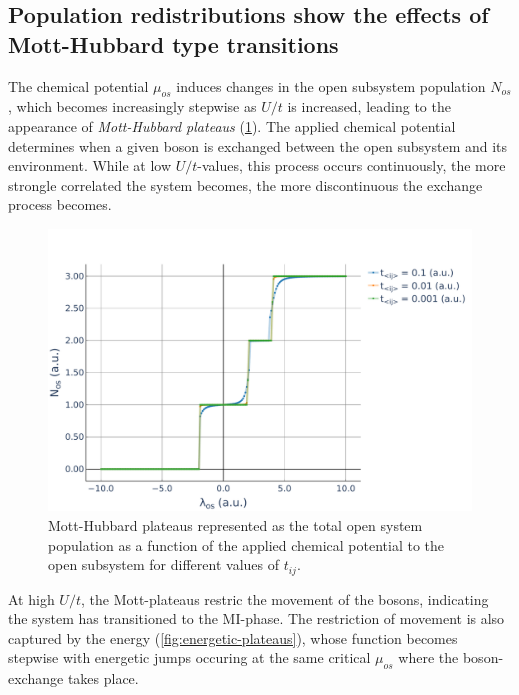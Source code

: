 \documentclass[twoside,twocolumn,9pt]{article}
\begin{document}
\subsection{Population redistributions show the effects of Mott-Hubbard type transitions}
The chemical potential $\mu_{os}$ induces changes in the open subsystem population $N_{os}$, which becomes increasingly stepwise as $U/t$ is increased, leading to the appearance of \emph{Mott-Hubbard plateaus} (\cref{fig:Mott-Hubbard}). The applied chemical potential determines when a given boson is exchanged between the open subsystem and its environment. While at low $U/t$-values, this process occurs continuously, the more strongle correlated the system becomes, the more discontinuous the exchange process becomes. 
\begin{center}
    \begin{figure}
        \includegraphics[width=\linewidth]{../code/figures/BH-3in3-NvsMu.pdf}
        \caption{Mott-Hubbard plateaus represented as the total open system population as a function of the applied chemical potential to the open subsystem for different values of $t_{ij}$.}
        \label{fig:Mott-Hubbard}
    \end{figure}
\end{center}
At high $U/t$, the Mott-plateaus restric the movement of the bosons, indicating the system has transitioned to the MI-phase. The restriction of movement is also captured by the energy (\cref{fig:energetic-plateaus}), whose function becomes stepwise with energetic jumps occuring at the same critical $\mu_{os}$ where the boson-exchange takes place.
\end{document}
